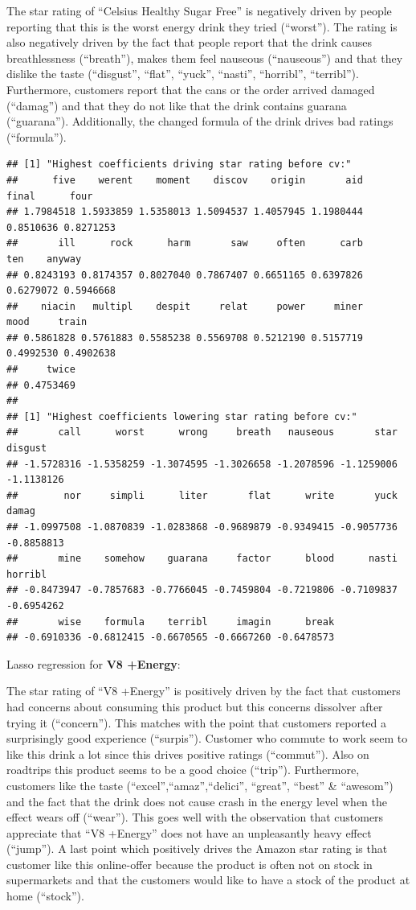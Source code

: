 \documentclass[
]{article}
\begin{document}
The star rating of ``Celsius Healthy Sugar Free'' is negatively driven
by people reporting that this is the worst energy drink they tried
(``worst''). The rating is also negatively driven by the fact that
people report that the drink causes breathlessness (``breath''), makes
them feel nauseous (``nauseous'') and that they dislike the taste
(``disgust'', ``flat'', ``yuck'', ``nasti'', ``horribl'', ``terribl'').
Furthermore, customers report that the cans or the order arrived damaged
(``damag'') and that they do not like that the drink contains guarana
(``guarana''). Additionally, the changed formula of the drink drives bad
ratings (``formula''). \small

\begin{verbatim}
## [1] "Highest coefficients driving star rating before cv:"
##      five    werent    moment    discov    origin       aid     final      four 
## 1.7984518 1.5933859 1.5358013 1.5094537 1.4057945 1.1980444 0.8510636 0.8271253 
##       ill      rock      harm       saw     often      carb       ten    anyway 
## 0.8243193 0.8174357 0.8027040 0.7867407 0.6651165 0.6397826 0.6279072 0.5946668 
##    niacin   multipl    despit     relat     power     miner      mood     train 
## 0.5861828 0.5761883 0.5585238 0.5569708 0.5212190 0.5157719 0.4992530 0.4902638 
##     twice 
## 0.4753469 
## 
## [1] "Highest coefficients lowering star rating before cv:"
##       call      worst      wrong     breath   nauseous       star    disgust 
## -1.5728316 -1.5358259 -1.3074595 -1.3026658 -1.2078596 -1.1259006 -1.1138126 
##        nor     simpli      liter       flat      write       yuck      damag 
## -1.0997508 -1.0870839 -1.0283868 -0.9689879 -0.9349415 -0.9057736 -0.8858813 
##       mine    somehow    guarana     factor      blood      nasti    horribl 
## -0.8473947 -0.7857683 -0.7766045 -0.7459804 -0.7219806 -0.7109837 -0.6954262 
##       wise    formula    terribl     imagin      break 
## -0.6910336 -0.6812415 -0.6670565 -0.6667260 -0.6478573
\end{verbatim}

\normalsize

Lasso regression for \textbf{V8 +Energy}:

The star rating of ``V8 +Energy'' is positively driven by the fact that
customers had concerns about consuming this product but this concerns
dissolver after trying it (``concern''). This matches with the point
that customers reported a surprisingly good experience (``surpis'').
Customer who commute to work seem to like this drink a lot since this
drives positive ratings (``commut''). Also on roadtrips this product
seems to be a good choice (``trip''). Furthermore, customers like the
taste (``excel'',``amaz'',``delici'', ``great'', ``best'' \& ``awesom'')
and the fact that the drink does not cause crash in the energy level
when the effect wears off (``wear''). This goes well with the
observation that customers appreciate that ``V8 +Energy'' does not have
an unpleasantly heavy effect (``jump''). A last point which positively
drives the Amazon star rating is that customer like this online-offer
because the product is often not on stock in supermarkets and that the
customers would like to have a stock of the product at home (``stock'').
\end{document}
